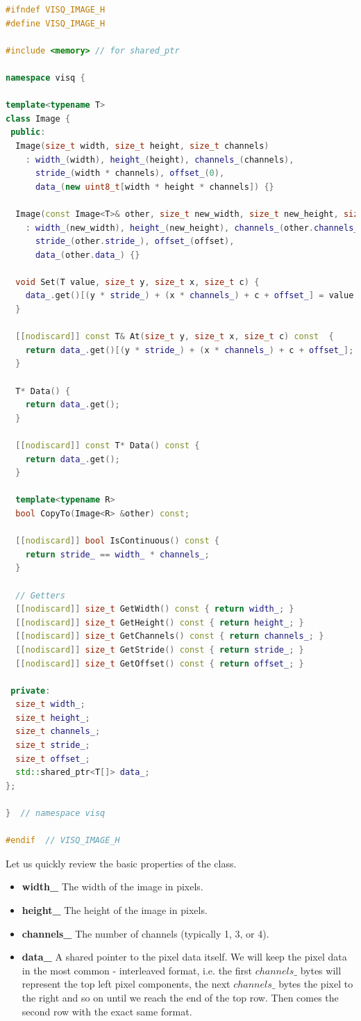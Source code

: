 \documentclass[11pt]{book}
\begin{document}
\begin{lstlisting}[language=C++, caption={Image class implementation}]
#ifndef VISQ_IMAGE_H
#define VISQ_IMAGE_H

#include <memory> // for shared_ptr

namespace visq {

template<typename T>
class Image {
 public:
  Image(size_t width, size_t height, size_t channels)
    : width_(width), height_(height), channels_(channels),
      stride_(width * channels), offset_(0),
      data_(new uint8_t[width * height * channels]) {}

  Image(const Image<T>& other, size_t new_width, size_t new_height, size_t offset)
    : width_(new_width), height_(new_height), channels_(other.channels_),
      stride_(other.stride_), offset_(offset),
      data_(other.data_) {}

  void Set(T value, size_t y, size_t x, size_t c) {
    data_.get()[(y * stride_) + (x * channels_) + c + offset_] = value;
  }

  [[nodiscard]] const T& At(size_t y, size_t x, size_t c) const  {
    return data_.get()[(y * stride_) + (x * channels_) + c + offset_];
  }

  T* Data() {
    return data_.get();
  }

  [[nodiscard]] const T* Data() const {
    return data_.get();
  }

  template<typename R>
  bool CopyTo(Image<R> &other) const;

  [[nodiscard]] bool IsContinuous() const {
    return stride_ == width_ * channels_;
  }

  // Getters
  [[nodiscard]] size_t GetWidth() const { return width_; }
  [[nodiscard]] size_t GetHeight() const { return height_; }
  [[nodiscard]] size_t GetChannels() const { return channels_; }
  [[nodiscard]] size_t GetStride() const { return stride_; }
  [[nodiscard]] size_t GetOffset() const { return offset_; }

 private:
  size_t width_;
  size_t height_;
  size_t channels_;
  size_t stride_;
  size_t offset_;
  std::shared_ptr<T[]> data_;
};

}  // namespace visq

#endif  // VISQ_IMAGE_H
\end{lstlisting}

Let us quickly review the basic properties of the class.

\begin{itemize}
	\item {\bf width\_} The width of the image in pixels.
	\item {\bf height\_} The height of the image in pixels.
	\item {\bf channels\_} The number of channels (typically 1, 3, or 4).
	\item {\bf data\_} A shared pointer to the pixel data itself. We will keep the pixel data in the most common - interleaved format, i.e. the first $channels\_$ bytes will represent the top left pixel components, the next $channels\_$ bytes the pixel to the right and so on until we reach the end of the top row. Then comes the second row with the exact same format.   
\end{itemize} 
\end{document}
